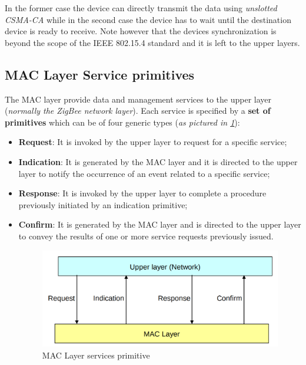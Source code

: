 \documentclass[10pt,a4paper]{report}
\theoremstyle{definition}
\begin{document}
In the former case the device can directly transmit the data using \textit{unslotted CSMA-CA} while in the second case the device has to wait until the destination device is ready to receive. Note however that the devices synchronization is beyond the scope of the IEEE 802.15.4 standard and it is left to the upper layers.
\subsection{MAC Layer Service primitives}\label{sec:mac-layer-service-primitives}
The MAC layer provide data and management services to the upper layer (\textit{normally the ZigBee network layer}). Each service is specified by a \textbf{set of primitives} which can be of four generic types (\textit{as pictured in \ref{mac-service-primitives}}):
\begin{itemize}
	\item 
	\textbf{Request}: It is invoked by the upper layer to request for a specific service;
	\item 
	\textbf{Indication}: It is generated by the MAC layer and it is directed to the upper layer to notify the occurrence of an event related to a specific service;
	\item 
	\textbf{Response}: It is invoked by the upper layer to complete a procedure previously initiated by an indication primitive;
	\item 
	\textbf{Confirm}: It is generated by the MAC layer and is directed to the upper layer to convey the results of one or more service requests previously issued.
	\begin{figure}[h!]
		\centering\includegraphics[scale=0.30]{images/Pasted image 20230417091904.png}
		\caption{MAC Layer services primitive}
	\label{mac-service-primitives}	
\end{figure}
	
\end{itemize}
\end{document}
